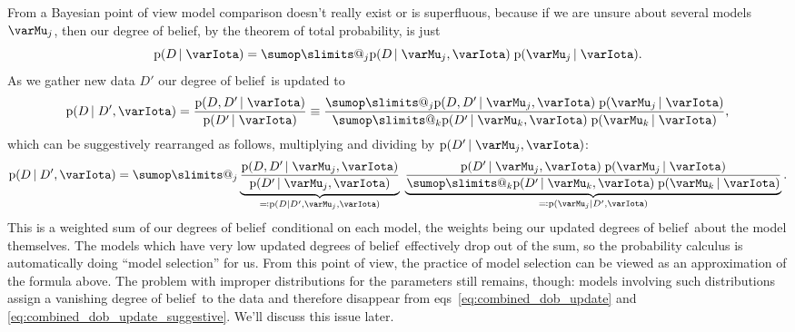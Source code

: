 \documentclass[\ifafour a4paper,12pt,\else a5paper,10pt,\fi%
onecolumn,oneside,article,%
british%
]{memoir}
\makeatletter
\theoremstyle{remark}
\theoremstyle{innote}
\def\sum{\DOTSI\sumop\slimits@}
\newcommand*{\defs}{\eqqcolon}
\newcommand*{\pf}{\mathrm{p}}%
\renewcommand*{\|}{\nonscript\,\vert\nonscript\;\mathopen{}}
\newcommand*{\eqns}{eqs}%
\newcommand*{\dob}{degree of belief}
\newcommand*{\dobs}{degrees of belief}
\newcommand*{\yM}{\varMu}
\newcommand*{\yI}{\varIota}
\newcommand*{\yD}{D}
\newcommand*{\yHm}{\yM}
\makeatother
\begin{document}
From a Bayesian point of view model comparison doesn't really exist or is
superfluous, because if we are unsure about several models $\yHm_j$, then
our \dob, by the theorem of total probability, is just
\begin{equation}
  \label{eq:combined_dob}
  \pf(\yD \| \yI) =
  \sum_j \pf(\yD \| \yHm_j,\yI)\; \pf(\yHm_j \| \yI).
\end{equation}
As we gather new data $\yD'$ our \dob\ is updated to
\begin{equation}
  \label{eq:combined_dob_update}
  \pf(\yD \|\yD', \yI) =
  \frac{\pf(\yD, \yD'\| \yI)}{\pf(\yD' \| \yI)} \equiv
  \frac{\sum_j \pf(\yD, \yD' \| \yHm_j,\yI)\; \pf(\yHm_j \| \yI)}{
    \sum_k \pf(\yD' \| \yHm_k,\yI)\; \pf(\yHm_k \| \yI)},
\end{equation}
which can be suggestively rearranged as follows, multiplying and
dividing by $\pf(\yD' \| \yHm_j, \yI)$:
\begin{equation}
  \label{eq:combined_dob_update_suggestive}
  \pf(\yD \|\yD', \yI) =
  \sum_j
  \underbrace{\frac{\pf(\yD, \yD' \| \yHm_j,\yI)}{\pf(\yD' \| \yHm_j,\yI)}}_{{}\defs\pf(\yD \| \yD', \yHm_j,\yI)}\;
  \underbrace{\frac{
  \pf(\yD' \| \yHm_j, \yI)\; \pf(\yHm_j \| \yI)
  }{
  \sum_k \pf(\yD' \| \yHm_k, \yI)\; \pf(\yHm_k \| \yI)
  }}_{{}\defs\pf(\yHm_j \| \yD', \yI)}.
\end{equation}
This is a weighted sum of our \dobs\ conditional on each model, the weights
being our updated \dobs\ about the model themselves. The models which have
very low updated \dobs\ effectively drop out of the sum, so the probability
calculus is automatically doing \enquote{model selection} for us. From this
point of view, the practice of model selection can be viewed as an
approximation of the formula above. The problem with improper distributions
for the parameters still remains, though: models involving such
distributions assign a vanishing \dob\ to the data and therefore disappear
from \eqns~\eqref{eq:combined_dob_update} and
\eqref{eq:combined_dob_update_suggestive}. We'll discuss this issue later.
\end{document}
